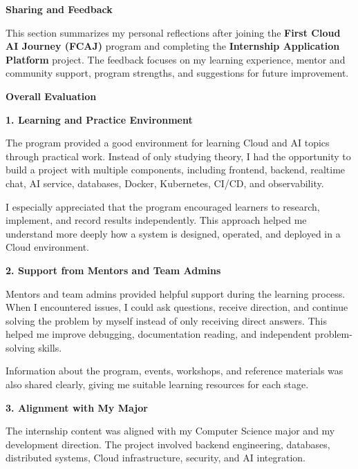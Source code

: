 \vspace{0.5em}\noindent\textbf{Sharing and Feedback}\par

This section summarizes my personal reflections after joining the
\textbf{First Cloud AI Journey (FCAJ)} program and completing the
\textbf{Internship Application Platform} project. The feedback focuses
on my learning experience, mentor and community support, program
strengths, and suggestions for future improvement.

\vspace{0.5em}\noindent\textbf{Overall Evaluation}\par

\vspace{0.5em}\noindent\textbf{1. Learning and Practice
Environment}\par

The program provided a good environment for learning Cloud and AI topics
through practical work. Instead of only studying theory, I had the
opportunity to build a project with multiple components, including
frontend, backend, realtime chat, AI service, databases, Docker,
Kubernetes, CI/CD, and observability.

I especially appreciated that the program encouraged learners to
research, implement, and record results independently. This approach
helped me understand more deeply how a system is designed, operated, and
deployed in a Cloud environment.

\vspace{0.5em}\noindent\textbf{2. Support from Mentors and Team
Admins}\par

Mentors and team admins provided helpful support during the learning
process. When I encountered issues, I could ask questions, receive
direction, and continue solving the problem by myself instead of only
receiving direct answers. This helped me improve debugging,
documentation reading, and independent problem-solving skills.

Information about the program, events, workshops, and reference
materials was also shared clearly, giving me suitable learning resources
for each stage.

\vspace{0.5em}\noindent\textbf{3. Alignment with My
Major}\par

The internship content was aligned with my Computer Science major and my
development direction. The project involved backend engineering,
databases, distributed systems, Cloud infrastructure, security, and AI
integration.

